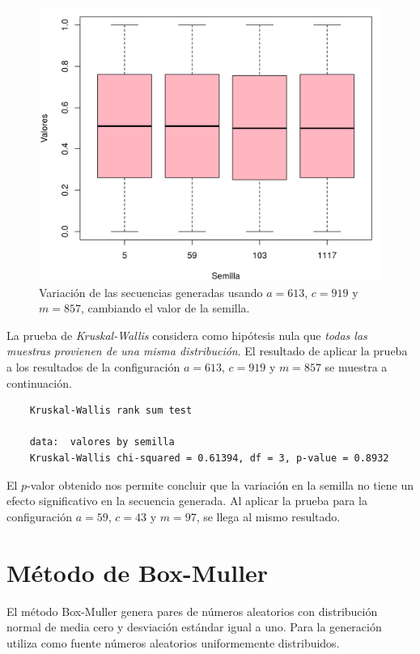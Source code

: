 \documentclass[12pt]{article}
\begin{document}
	\begin{figure}
		\centering
		\includegraphics[scale=0.6]{var_semilla.png}
		\caption{Variación de las secuencias generadas usando $a=613$, $c= 919$ y $m=857$, cambiando el valor de la semilla.}
		\label{bigotes_semilla}
	\end{figure}
	
	La prueba de {\em Kruskal-Wallis} considera como hipótesis nula que {\em todas las muestras provienen de una misma distribución}. El resultado de aplicar la prueba a los resultados de la configuración $a=613$, $c= 919$ y $m=857$ se muestra a continuación.
	\begin{verbatim}
	Kruskal-Wallis rank sum test

	data:  valores by semilla
	Kruskal-Wallis chi-squared = 0.61394, df = 3, p-value = 0.8932
	\end{verbatim}
	 
	El $p$-valor obtenido nos permite concluir que la variación en la semilla no tiene un efecto significativo en la secuencia generada. Al aplicar la prueba para la configuración $a=59$, $c= 43$ y $m=97$, se llega al mismo resultado. 
	
	
	\section{Método de Box-Muller}
	
	El método Box-Muller genera pares de números aleatorios con distribución normal de media cero y desviación estándar igual a uno. Para la generación utiliza como fuente números aleatorios uniformemente distribuidos.
	
\end{document}
